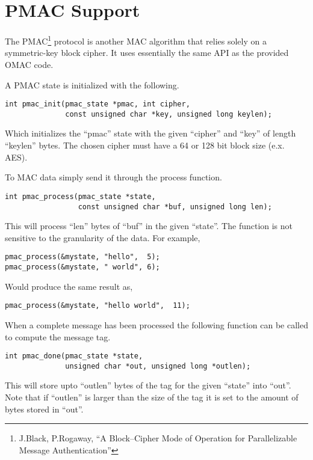 \documentclass[b5paper]{book}
\begin{document}
\section{PMAC Support}
The PMAC\footnote{J.Black, P.Rogaway, ``A Block--Cipher Mode of Operation for Parallelizable Message Authentication''} 
protocol is another MAC algorithm that relies solely on a symmetric-key block cipher.  It uses essentially the same
API as the provided OMAC code.  

A PMAC state is initialized with the following.

\begin{verbatim}
int pmac_init(pmac_state *pmac, int cipher, 
              const unsigned char *key, unsigned long keylen);
\end{verbatim}
Which initializes the ``pmac'' state with the given ``cipher'' and ``key'' of length ``keylen'' bytes.  The chosen cipher
must have a 64 or 128 bit block size (e.x. AES).

To MAC data simply send it through the process function.

\begin{verbatim}
int pmac_process(pmac_state *state, 
                 const unsigned char *buf, unsigned long len);
\end{verbatim}
This will process ``len'' bytes of ``buf'' in the given ``state''.  The function is not sensitive to the granularity of the
data.  For example,

\begin{verbatim}
pmac_process(&mystate, "hello",  5);
pmac_process(&mystate, " world", 6);
\end{verbatim}

Would produce the same result as,

\begin{verbatim}
pmac_process(&mystate, "hello world",  11);
\end{verbatim}

When a complete message has been processed the following function can be called to compute the message tag.

\begin{verbatim}
int pmac_done(pmac_state *state, 
              unsigned char *out, unsigned long *outlen);
\end{verbatim}
This will store upto ``outlen'' bytes of the tag for the given ``state'' into ``out''.  Note that if ``outlen'' is larger
than the size of the tag it is set to the amount of bytes stored in ``out''.
\end{document}
